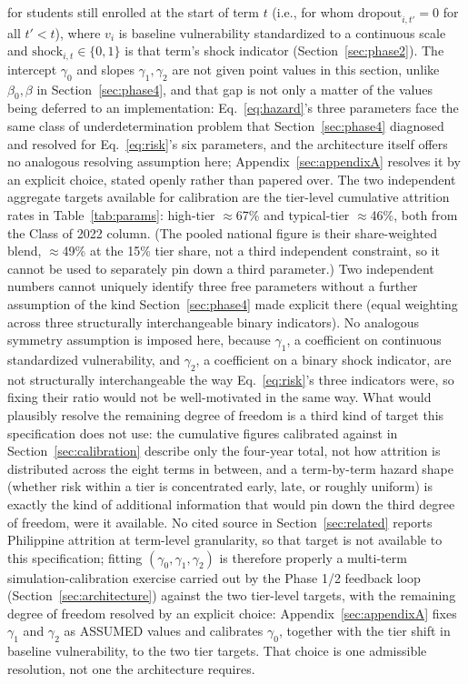 \documentclass[11pt]{article}
\begin{document}
for students still enrolled at the start of term $t$ (i.e., for whom $\text{dropout}_{i,t'}=0$ for all $t'<t$), where $v_i$ is baseline vulnerability standardized to a continuous scale and $\text{shock}_{i,t}\in\{0,1\}$ is that term's shock indicator (Section~\ref{sec:phase2}). The intercept $\gamma_0$ and slopes $\gamma_1,\gamma_2$ are not given point values in this section, unlike $\beta_0,\beta$ in Section~\ref{sec:phase4}, and that gap is not only a matter of the values being deferred to an implementation: Eq.~\ref{eq:hazard}'s three parameters face the same class of underdetermination problem that Section~\ref{sec:phase4} diagnosed and resolved for Eq.~\ref{eq:risk}'s six parameters, and the architecture itself offers no analogous resolving assumption here; Appendix~\ref{sec:appendixA} resolves it by an explicit choice, stated openly rather than papered over. The two independent aggregate targets available for calibration are the tier-level cumulative attrition rates in Table~\ref{tab:params}: high-tier $\approx$67\% and typical-tier $\approx$46\%, both from the Class of 2022 column. (The pooled national figure is their share-weighted blend, $\approx$49\% at the 15\% tier share, not a third independent constraint, so it cannot be used to separately pin down a third parameter.) Two independent numbers cannot uniquely identify three free parameters without a further assumption of the kind Section~\ref{sec:phase4} made explicit there (equal weighting across three structurally interchangeable binary indicators). No analogous symmetry assumption is imposed here, because $\gamma_1$, a coefficient on continuous standardized vulnerability, and $\gamma_2$, a coefficient on a binary shock indicator, are not structurally interchangeable the way Eq.~\ref{eq:risk}'s three indicators were, so fixing their ratio would not be well-motivated in the same way. What would plausibly resolve the remaining degree of freedom is a third kind of target this specification does not use: the cumulative figures calibrated against in Section~\ref{sec:calibration} describe only the four-year total, not how attrition is distributed across the eight terms in between, and a term-by-term hazard shape (whether risk within a tier is concentrated early, late, or roughly uniform) is exactly the kind of additional information that would pin down the third degree of freedom, were it available. No cited source in Section~\ref{sec:related} reports Philippine attrition at term-level granularity, so that target is not available to this specification; fitting $(\gamma_0,\gamma_1,\gamma_2)$ is therefore properly a multi-term simulation-calibration exercise carried out by the Phase 1/2 feedback loop (Section~\ref{sec:architecture}) against the two tier-level targets, with the remaining degree of freedom resolved by an explicit choice: Appendix~\ref{sec:appendixA} fixes $\gamma_1$ and $\gamma_2$ as ASSUMED values and calibrates $\gamma_0$, together with the tier shift in baseline vulnerability, to the two tier targets. That choice is one admissible resolution, not one the architecture requires.
\end{document}
